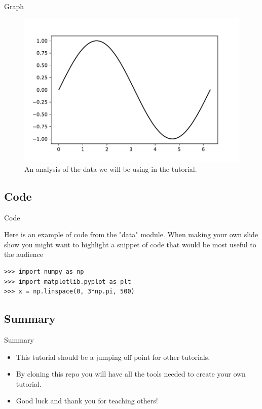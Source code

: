 \documentclass{beamer}
\begin{document}
\begin{frame}{Graph}

\begin{figure}
\includegraphics[width=\textwidth]{figs/sin} 
\caption{\label{fig:your-figure} An analysis of the data we will be using in the tutorial.}
\end{figure}

\end{frame}{}

\subsection{Code}

\begin{frame}[fragile]{Code}

Here is an example of code from the "data" module. When making your own slide show you might want to highlight a snippet of code that would be most useful to the audience 

\begin{verbatim}
>>> import numpy as np
>>> import matplotlib.pyplot as plt
>>> x = np.linspace(0, 3*np.pi, 500)
\end{verbatim}

\end{frame}

\subsection{Summary}

\begin{frame}{Summary}

\begin{itemize}
\item This tutorial should be a jumping off point for other tutorials. 
\item By cloning this repo you will have all the tools needed to create your own tutorial.
\item Good luck and thank you for teaching others!
\end{itemize}

\end{frame}
\end{document}
